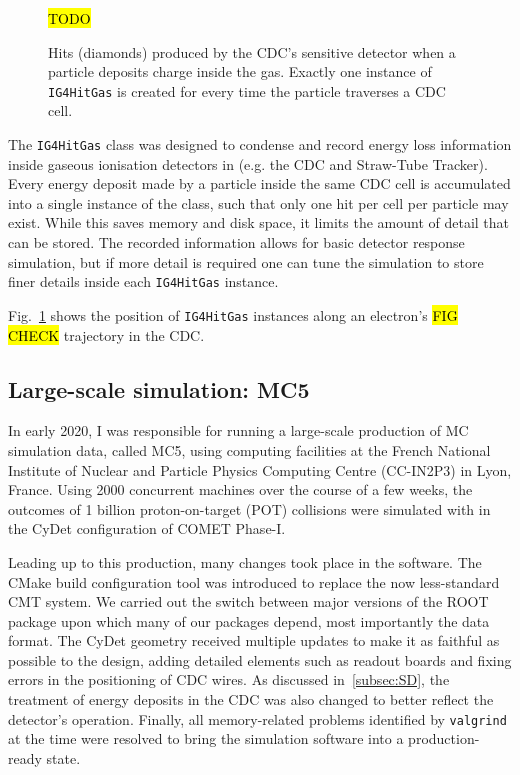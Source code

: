 \begin{figure}
    \centering
    \hl{TODO}
    \caption{Hits (diamonds) produced by the CDC's sensitive detector when a particle deposits charge inside the gas. Exactly one instance of \texttt{IG4HitGas} is created for every time the particle traverses a CDC cell.}
    \label{fig:sim_cdc_hits}
\end{figure}

The \texttt{IG4HitGas} class was designed to condense and record energy loss information inside gaseous ionisation detectors in \SimG (e.g. the CDC and Straw-Tube Tracker). Every energy deposit made by a particle inside the same CDC cell is accumulated into a single instance of the class, such that only one hit per cell per particle may exist. While this saves memory and disk space, it limits the amount of detail that can be stored. The recorded information allows for basic detector response simulation, but if more detail is required one can tune the \SimG simulation to store finer details inside each \texttt{IG4HitGas} instance.

Fig.~\ref{fig:sim_cdc_hits} shows the position of \texttt{IG4HitGas} instances along an electron's \hl{FIG CHECK} trajectory in the CDC.


\subsection{Large-scale simulation: MC5}\label{sec:mc5}
In early 2020, I was responsible for running a large-scale production of MC simulation data, called MC5, using computing facilities at the French National Institute of Nuclear and Particle Physics Computing Centre (CC-IN2P3) in Lyon, France.
Using \num{2000} concurrent machines over the course of a few weeks, the outcomes of 1 billion proton-on-target (POT) collisions were simulated with \SimG in the CyDet configuration of COMET Phase-I.

Leading up to this production, many changes took place in the software. The CMake build configuration tool was introduced to replace the now less-standard CMT system. We carried out the switch between major versions of the ROOT package upon which many of our packages depend, most importantly the \oaEvent data format. The CyDet geometry received multiple updates to make it as faithful as possible to the design, adding detailed elements such as readout boards and fixing errors in the positioning of CDC wires. As discussed in~\ref{subsec:SD}, the treatment of energy deposits in the CDC was also changed to better reflect the detector's operation.  %
Finally, all memory-related problems identified by \texttt{valgrind} at the time were resolved to bring the simulation software into a production-ready state.

